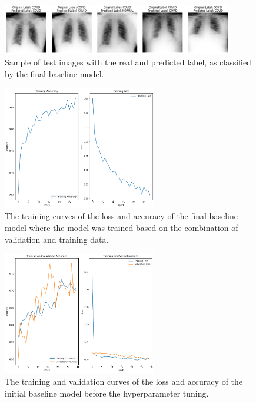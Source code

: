 \documentclass[conference]{IEEEtran}
\begin{document}
\begin{figure}[h] \centering \includegraphics[width=0.9\textwidth]{fig_task2_examples_images_label_vs_predictedlabel.png} 
	\caption{Sample of test images with the real and predicted label, as classified by the final baseline model.} 
	\label{fig:task2_image_examples} 
\end{figure}


\begin{figure}[h] \centering \includegraphics[width=0.6\textwidth]{fig_task2_training_curves_train_final_model.png}
	\caption{The training curves of the loss and accuracy of the final baseline model where the model was trained based on the combination of validation and training data.} 	
	\label{fig:task2_curves_final} 
\end{figure}

\begin{figure}[h] \centering \includegraphics[width=0.6\textwidth]{fig_task2_training_curves_train_validation_initial_model.png} 
	\caption{The training and validation curves of the loss and accuracy of the initial baseline model before the hyperparameter tuning.} 
	\label{fig:task2_curves_initial} 
\end{figure}
\end{document}
